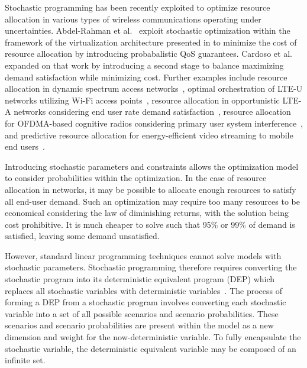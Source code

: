 \documentclass[12pt,dvipsnames]{report}
\begin{document}
Stochastic programming has been recently exploited to optimize resource allocation in various types of wireless communications operating under uncertainties.  Abdel-Rahman et al.~\cite{MJ_CCNC_16} exploit stochastic optimization within the framework of the virtualization architecture presented in  to minimize the cost of resource allocation by introducing probabalistic QoS guarantees.  Cardoso et al.~\cite{MJ_MECOMM_17} expanded on that work by introducing a second stage to balance maximizing demand satisfaction while minimizing cost.  Further examples include resource allocation in dynamic spectrum access networks~\cite{MJ_TW_13}, optimal orchestration of LTE-U networks utilizing Wi-Fi access points~\cite{MJ_WCNC_16}, resource allocation in opportunistic LTE-A networks considering end user rate demand satisfaction~\cite{MJ_DySPAN_15}, resource allocation for OFDMA-based cognitive radios considering primary user system interference~\cite{CC_OFDMA}, and predictive resource allocation for energy-efficient video streaming to mobile end users~\cite{CC_video}.

Introducing stochastic parameters and constraints allows the optimization model to consider probabilities within the optimization.  In the case of resource allocation in networks, it may be possible to allocate enough resources to satisfy all end-user demand.  Such an optimization may require too many resources to be economical considering the law of diminishing returns, with the solution being cost prohibitive.  It is much cheaper to solve such that 95\% or 99\% of demand is satisfied, leaving some demand unsatisfied.

However, standard linear programming techniques cannot solve models with stochastic parameters.  Stochastic programming therefore requires converting the stochastic program into its deterministic equivalent program (DEP) which replaces all stochastic variables with deterministic variables~\cite{stochprogramming}.  The process of forming a DEP from a stochastic program involves converting each stochastic variable into a set of all possible scenarios and scenario probabilities.  These scenarios and scenario probabilities are present within the model as a new dimension and weight for the now-deterministic variable.  To fully encapsulate the stochastic variable, the deterministic equivalent variable may be composed of an infinite set.
\end{document}
